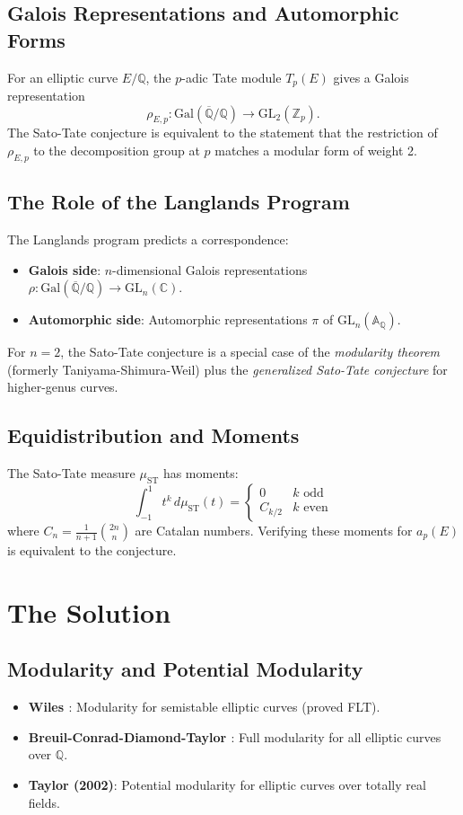 \subsection{Galois Representations and Automorphic Forms}
For an elliptic curve $E/\mathbb{Q}$, the $p$-adic Tate module $T_p(E)$ gives a Galois representation
\[
\rho_{E,p}: \text{Gal}(\overline{\mathbb{Q}}/\mathbb{Q}) \to \text{GL}_2(\mathbb{Z}_p).
\]
The Sato-Tate conjecture is equivalent to the statement that the restriction of $\rho_{E,p}$ to the decomposition group at $p$ matches a modular form of weight 2.

\subsection{The Role of the Langlands Program}
The Langlands program predicts a correspondence:
\begin{itemize}
\item \textbf{Galois side}: $n$-dimensional Galois representations $\rho: \text{Gal}(\overline{\mathbb{Q}}/\mathbb{Q}) \to \text{GL}_n(\mathbb{C})$.
\item \textbf{Automorphic side}: Automorphic representations $\pi$ of $\text{GL}_n(\mathbb{A}_{\mathbb{Q}})$.
\end{itemize}
For $n=2$, the Sato-Tate conjecture is a special case of the \emph{modularity theorem} (formerly Taniyama-Shimura-Weil) plus the \emph{generalized Sato-Tate conjecture} for higher-genus curves.

\subsection{Equidistribution and Moments}
The Sato-Tate measure $\mu_{\text{ST}}$ has moments:
\[
\int_{-1}^1 t^k \, d\mu_{\text{ST}}(t) = \begin{cases}
0 & k \text{ odd} \\
C_{k/2} & k \text{ even}
\end{cases}
\]
where $C_n = \frac{1}{n+1}\binom{2n}{n}$ are Catalan numbers. Verifying these moments for $a_p(E)$ is equivalent to the conjecture.

\section{The Solution}

\subsection{Modularity and Potential Modularity}
\begin{itemize}
\item \textbf{Wiles \cite{wiles1995}}: Modularity for semistable elliptic curves (proved FLT).
\item \textbf{Breuil-Conrad-Diamond-Taylor \cite{bcdt2001}}: Full modularity for all elliptic curves over $\mathbb{Q}$.
\item \textbf{Taylor (2002)}: Potential modularity for elliptic curves over totally real fields.
\end{itemize}

